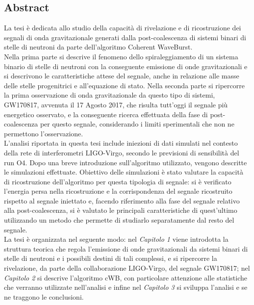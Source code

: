 \begin{changemargin}{2cm}{2cm}
	\chapter{Abstract}
		La tesi è dedicata allo studio della capacità di rivelazione e di ricostruzione dei segnali di onda gravitazionale generati dalla post-coalescenza di sistemi binari di stelle di neutroni da parte dell'algoritmo Coherent WaveBurst.\\
		Nella prima parte si descrive il fenomeno dello spiraleggiamento di un sistema binario di stelle di neutroni con la conseguente emissione di onde gravitazionali e si descrivono le caratteristiche attese del segnale, anche in relazione alle masse delle stelle progenitrici e all'equazione di stato. Nella seconda parte si ripercorre la prima osservazione di onda gravitazionale da questo tipo di sistemi, GW170817, avvenuta il 17 Agosto 2017, che risulta tutt'oggi il segnale più energetico osservato, e la conseguente ricerca effettuata della fase di post-coalescenza per questo segnale, considerando i limiti sperimentali che non ne permettono l'osservazione. \\
		L'analisi riportata in questa tesi include iniezioni di dati simulati nel contesto della rete di interferometri LIGO-Virgo, secondo le previsioni di sensibilità del run O4. Dopo una breve introduzione sull'algoritmo utilizzato, vengono descritte le simulazioni effettuate. Obiettivo delle simulazioni è stato valutare la capacità di ricostruzione dell'algoritmo per questa tipologia di segnale: si è verificato l'energia persa nella ricostruzione e la corrispondenza del segnale ricostruito rispetto al segnale iniettato e, facendo riferimento alla fase del segnale relativo alla post-coalescenza, si è valutato le principali caratteristiche di quest'ultimo utilizzando un metodo che permette di studiarlo separatamente dal resto del segnale. \\
		La tesi è organizzata nel seguente modo: nel \textit{Capitolo 1} viene introdotta la struttura teorica che regola l'emissione di onde gravitazionali da sistemi binari di stelle di neutroni e i possibili destini di tali complessi, e si ripercorre la rivelazione, da parte della collaborazione LIGO-Virgo, del segnale GW170817; nel \textit{Capitolo 2} si descrive l'algoritmo cWB, con particolare attenzione alle statistiche che verranno utilizzate nell'analisi e infine nel \textit{Capitolo 3} si sviluppa l'analisi e se ne traggono le conclusioni.
\end{changemargin}
\tableofcontents